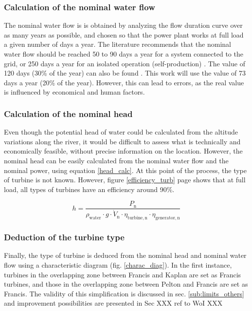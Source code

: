 \subsubsection{Calculation of the nominal water flow}
\label{sub:extrapol_dV_n}

The nominal water flow is is obtained by analyzing the flow duration curve over as many years as possible, and chosen so that the power plant works at full load a given number of days a year. The literature recommends that the nominal water flow should be reached 50 to 90 days a year for a system connected to the grid, or 250 days a year for an isolated operation (self-production) \cite{pacer}\cite{cetmef}. The value of 120 days (30\% of the year) can also be found \cite{cetmef}. This work will use the value of 73 days a year (20\% of the year). However, this can lead to errors, as the real value is influenced by economical and human factors.

\subsubsection{Calculation of the nominal head}
\label{sub:extrapol_h_n}

Even though the potential head of water could be calculated from the altitude variations along the river, it would be difficult to assess what is technically and economically feasible, without precise information on the location. However, the nominal head can be easily calculated from the nominal water flow and the nominal power, using equation \ref{head_calc}. At this point of the process, the type of turbine is not known. However, figure \ref{efficiency_turb} page \pageref{efficiency_turb} shows that at full load, all types of turbines have an efficiency around 90\%.

\begin{equation}
\label{head_calc} 
 h = \frac{P_\mathrm{n}}{\rho_\mathrm{water} \cdot g \cdot \dot{V}_\mathrm{n} \cdot \eta_\mathrm{turbine,n} \cdot \eta_\mathrm{generator,n}}
\end{equation}

\subsubsection{Deduction of the turbine type}
Finally, the type of turbine is deduced from the nominal head and nominal water flow using a characteristic diagram (fig. \ref{charac_diag}).  In  the first instance, turbines in the overlapping zone between Francis and Kaplan are set as Francis turbines, and those in the overlapping zone between Pelton and Francis are set as Francis. The validity of this simplification is discussed in sec. \ref{sub:limits_others} and improvement possibilities are presented in Sec XXX ref to WoI XXX

